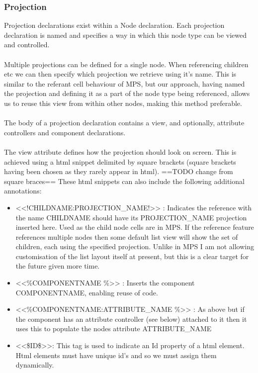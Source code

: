 \documentclass{report}
\begin{document}
\subsubsection{Projection}
Projection declarations exist within a Node declaration. Each projection declaration is named and specifies a way in which this node type can be viewed and controlled.
\\
\\
Multiple projections can be defined for a single node. When referencing children etc we can then specify which projection we retrieve using it's name. This is similar to the referant cell behaviour of MPS, but our approach, having named the projection and defining it as a part of the node type being referenced, allows us to reuse this view from within other nodes, making this method preferable.
\\
\\
The body of a projection declaration contains a view, and optionally, attribute controllers and component declarations.
\\
\\
The view attribute defines how the projection should look on screen. This is achieved using a html snippet delimited by square brackets (square brackets having been chosen as they rarely appear in html). 
==TODO change from square braces== These html snippets can also include the following additional annotations:
\begin{itemize}
\item <<!CHILDNAME:PROJECTION\_NAME!>> : Indicates the reference with the name CHILDNAME should have its PROJECTION\_NAME projection inserted here. Used as the child node cells are in MPS. If the reference feature references multiple nodes then some default list view will show the set of children, each using the specified projection. Unlike in MPS I am not allowing customisation of the list layout itself at present, but this is a clear target for the future given more time.
\item <<\%COMPONENTNAME \%>> : Inserts the component COMPONENTNAME, enabling reuse of code.
\item <<\%COMPONENTNAME:ATTRIBUTE\_NAME \%>> : As above but if the component has an attribute controller (see below) attached to it then it uses this to populate the nodes attribute ATTRIBUTE\_NAME
\item <<\$ID\$>>: This tag is used to indicate an Id property of a html element. Html elements must have unique id's and so we must assign them dynamically.
\end{itemize}
\end{document}
